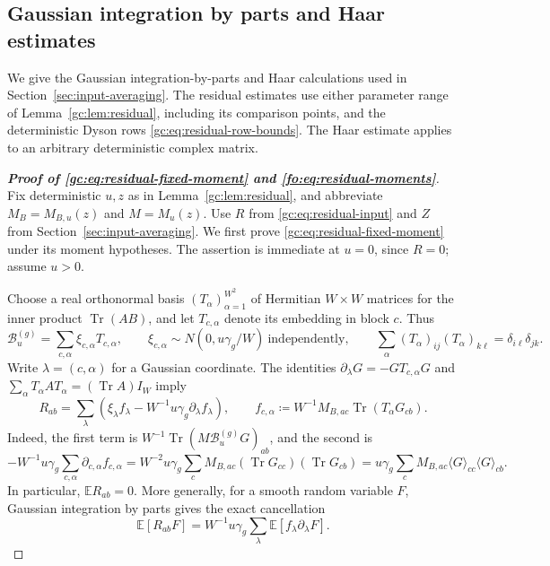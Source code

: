 \documentclass[11pt]{article}
\numberwithin{equation}{section}
\theoremstyle{remark}
\newcommand{\E}{\mathbb E}
\newcommand{\Tr}{\operatorname{Tr}}
\begin{document}
\subsection{Gaussian integration by parts and Haar estimates}
\label{sec:classical-random-matrix}

We give the Gaussian integration-by-parts and Haar calculations used
in Section~\ref{sec:input-averaging}. The residual estimates use either
parameter range of Lemma~\ref{gc:lem:residual}, including its comparison
points, and the deterministic Dyson rows
\eqref{gc:eq:residual-row-bounds}. The Haar estimate applies to an
arbitrary deterministic complex matrix.

\begin{proof}[\textbf{Proof of \eqref{gc:eq:residual-fixed-moment} and \eqref{fo:eq:residual-moments}}]
Fix deterministic $u,z$ as in Lemma~\ref{gc:lem:residual}, and abbreviate
$M_B=M_{B,u}(z)$ and $M=M_u(z)$. Use $R$ from
\eqref{gc:eq:residual-input} and $Z$ from
Section~\ref{sec:input-averaging}. We first prove
\eqref{gc:eq:residual-fixed-moment} under its moment hypotheses.
The assertion is immediate at $u=0$, since $R=0$; assume $u>0$.

Choose a real orthonormal basis $(T_\alpha)_{\alpha=1}^{W^2}$ of
Hermitian $W\times W$ matrices for the inner product $\Tr(AB)$,
and let $T_{c,\alpha}$ denote its embedding in block $c$. Thus
\[
 \mathcal B_u^{(g)}=\sum_{c,\alpha}\xi_{c,\alpha}T_{c,\alpha},\qquad
 \xi_{c,\alpha}\sim N(0,u\gamma_g/W)\ \text{independently},\qquad
 \sum_\alpha(T_\alpha)_{ij}(T_\alpha)_{k\ell}
       =\delta_{i\ell}\delta_{jk}.
\]
Write $\lambda=(c,\alpha)$ for a Gaussian coordinate. The identities
$\partial_\lambda G=-GT_{c,\alpha}G$ and
$\sum_\alpha T_\alpha A T_\alpha=(\Tr A)I_W$ imply
\begin{equation}\label{gc:eq:divergence}
 R_{ab}=\sum_\lambda\left(
       \xi_\lambda f_\lambda-W^{-1} u\gamma_g\partial_\lambda f_\lambda
                            \right),\qquad
 f_{c,\alpha}\coloneqq W^{-1} M_{B,ac}\Tr(T_\alpha G_{cb}).
\end{equation}
Indeed, the first term is $W^{-1}\Tr(M\mathcal B_u^{(g)}G)_{ab}$,
and the second is
\[
 -W^{-1} u\gamma_g\sum_{c,\alpha}\partial_{c,\alpha}f_{c,\alpha}
 =W^{-2} u\gamma_g\sum_cM_{B,ac}
       (\Tr G_{cc})(\Tr G_{cb})
 =u\gamma_g\sum_cM_{B,ac}\langle G\rangle_{cc}\langle G\rangle_{cb}.
\]
In particular, $\E R_{ab}=0$. More generally, for a smooth random
variable $F$, Gaussian integration by parts gives the exact cancellation
\[
 \E[R_{ab}F]=W^{-1} u\gamma_g
                  \sum_\lambda\E[f_\lambda\partial_\lambda F].
\]


\end{proof}
\end{document}
